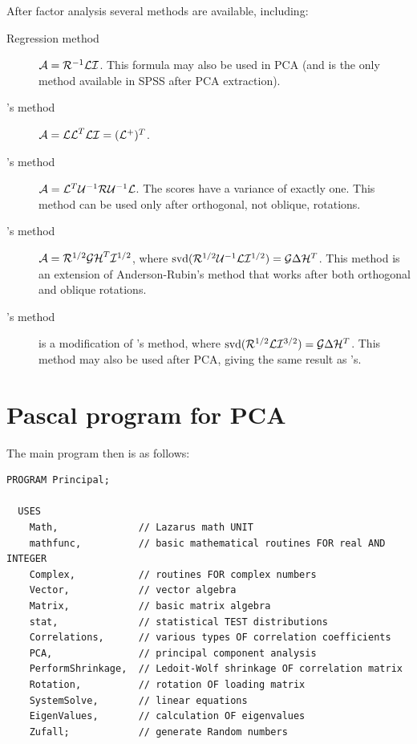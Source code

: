 \begin{refsection}
After factor analysis several methods are available, including:
\begin{description}
  \item[Regression method]{\parencite{Tom-35,Thu-35} \(\mathcal{A} = \mathcal{R}^{-1} \mathcal{LI} \). This formula may also be used in PCA (and is the only method available in SPSS after PCA extraction).}
  \item['s method]{\parencite{Hor-65} \(\mathcal{A} = \mathcal{LL}^T\mathcal{LI} = (\mathcal{L}^+)^T \). }
  \item['s method]{\(\mathcal{A} = \mathcal{L}^T\mathcal{U}^{-1} \mathcal{R} \mathcal{U}^{-1} \mathcal{L} \). The scores have a variance of exactly one. This method can be used only after orthogonal, not oblique, rotations.}
  \item['s method]{\(\mathcal{A} = \mathcal{R}^{1/2} \mathcal{GH}^T \mathcal{I}^{1/2} \), where \( \operatorname{svd}(\mathcal{R}^{1/2} \mathcal{U}^{-1} \mathcal{L} \mathcal{I}^{1/2}) = \mathcal{G}\Delta\mathcal{H}^T \). This method is an extension of {Anderson-Rubin}'s method that works after both orthogonal and oblique rotations.  }
  \item['s method]{is a modification of 's method, where \( \operatorname{svd}(\mathcal{R}^{1/2} \mathcal{L} \mathcal{I}^{3/2}) = \mathcal{G}\Delta\mathcal{H}^T \). This method may also be used after PCA, giving the same result as 's.}
\end{description}

\section{Pascal program for PCA}

The main program then is as follows:
\begin{lstlisting}[caption=Main program for PCA]
  PROGRAM Principal;

  USES
    Math,              // Lazarus math UNIT
    mathfunc,          // basic mathematical routines FOR real AND INTEGER
    Complex,           // routines FOR complex numbers
    Vector,            // vector algebra
    Matrix,            // basic matrix algebra
    stat,              // statistical TEST distributions
    Correlations,      // various types OF correlation coefficients
    PCA,               // principal component analysis
    PerformShrinkage,  // Ledoit-Wolf shrinkage OF correlation matrix
    Rotation,          // rotation OF loading matrix
    SystemSolve,       // linear equations
    EigenValues,       // calculation OF eigenvalues
    Zufall;            // generate Random numbers


\end{lstlisting}
\end{refsection}
